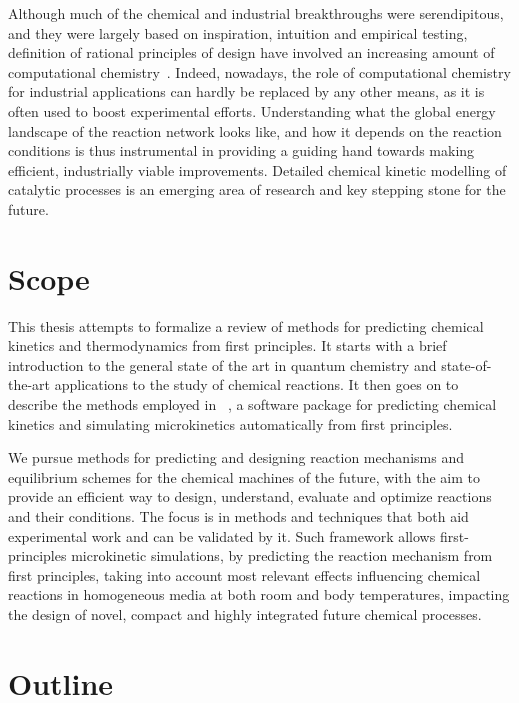 Although much of the chemical and industrial breakthroughs were serendipitous,
and they were largely based on inspiration,
intuition and empirical testing,
definition of rational principles of design have involved an increasing amount of computational
chemistry~\cite{Kitchin_2012}.
Indeed,
nowadays,
the role of computational chemistry for industrial applications can
hardly be replaced by any other means,
as it is often used to boost experimental efforts.
Understanding what the global energy landscape of the reaction network looks like,
and how it depends on the reaction conditions is thus instrumental in providing a guiding hand towards making efficient,
industrially viable improvements.
Detailed chemical kinetic modelling of catalytic processes is an emerging area of research and key stepping stone for the future.

\section*{Scope}%
\label{sec:scope}

This thesis attempts to formalize a review of methods for predicting chemical
kinetics and thermodynamics from first principles.
It starts with a brief introduction to the general state of the art in quantum
chemistry and state-of-the-art applications to the study of chemical reactions.
It then goes on to describe the methods employed in
\overreact~\cite{Schneider_2022},
a software
package for predicting chemical kinetics and simulating microkinetics
automatically from first principles.

We pursue methods for predicting and designing reaction mechanisms
and equilibrium schemes for the chemical machines of the future,
with the aim to provide an efficient way to design,
understand,
evaluate and optimize reactions and their conditions.
The focus is in methods and techniques that both aid experimental work and can be validated by it.
Such framework allows first-principles microkinetic simulations,
by predicting the reaction mechanism from first principles,
taking into account most relevant effects influencing
chemical reactions in homogeneous media at both room and body temperatures,
impacting the design of novel,
compact and highly integrated future chemical processes.

\section*{Outline}%
\label{sec:outline}

